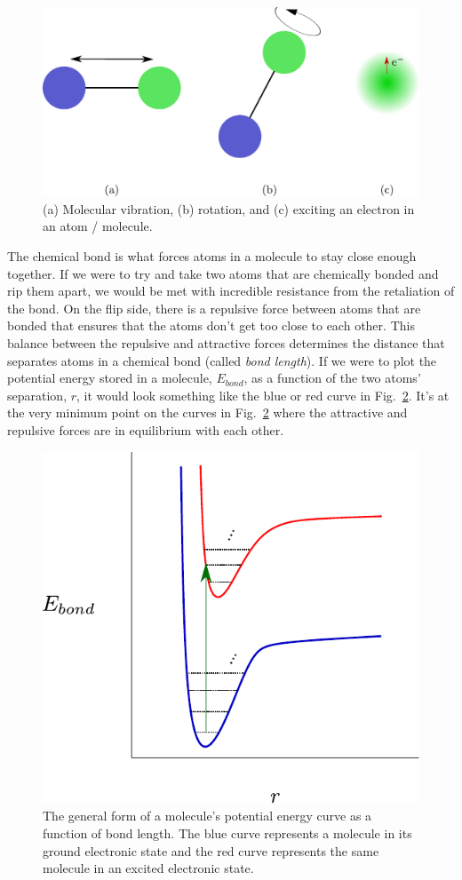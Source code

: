 \documentclass[12pt]{article}
\begin{document}
\begin{figure}
    \begin{center}
        \includegraphics[width=0.5\linewidth]{figures/molecule_DOFs.pdf}
    \end{center}
    \caption{
    (a) Molecular vibration, (b) rotation, and (c) exciting an electron in an atom / molecule.
    }
    \label{fig:DOFs}
\end{figure}

The chemical bond is what forces atoms in a molecule to stay close enough together. If we were to try and take two atoms that are chemically bonded and rip them apart, we would be met with incredible resistance from the retaliation of the bond. On the flip side, there is a repulsive force between atoms that are bonded that ensures that the atoms don't get too close to each other. This balance between the repulsive and attractive forces determines the distance that separates atoms in a chemical bond (called \textit{bond length}). If we were to plot the potential energy stored in a molecule, $E_{bond}$, as a function of the two atoms' separation, $r$, it would look something like the blue or red curve in Fig.~\ref{fig:potential_curve}. It's at the very minimum point on the curves in Fig.~\ref{fig:potential_curve} where the attractive and repulsive forces are in equilibrium with each other.

\begin{figure}
    \begin{center}
        \includegraphics[width=0.4\linewidth]{figures/potential_energy_curve.pdf}
    \end{center}
    \caption{
    The general form of a molecule's potential energy curve as a function of bond length. The blue curve represents a molecule in its ground electronic state and the red curve represents the same molecule in an excited electronic state.
    }
    \label{fig:potential_curve}
\end{figure}
\end{document}
